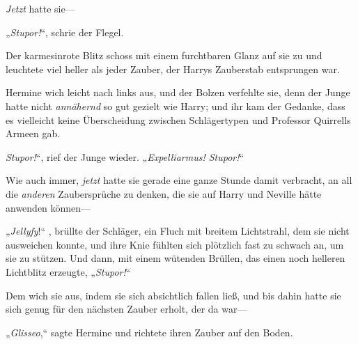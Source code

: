 \emph{Jetzt} hatte sie—

„\emph{Stupor!}“, schrie der Flegel.

Der karmesinrote Blitz schoss mit einem furchtbaren Glanz auf sie zu und leuchtete viel heller als jeder Zauber, der Harrys Zauberstab entsprungen war.

Hermine wich leicht nach links aus, und der Bolzen verfehlte sie, denn der Junge hatte nicht \emph{annähernd} so gut gezielt wie Harry; und ihr kam der Gedanke, dass es vielleicht keine Überscheidung zwischen Schlägertypen und Professor Quirrells Armeen gab.

\emph{Stupor!}“, rief der Junge wieder. „\emph{Expelliarmus! Stupor!}“

Wie auch immer, \emph{jetzt} hatte sie gerade eine ganze Stunde damit verbracht, an all die \emph{anderen} Zaubersprüche zu denken, die sie auf Harry und Neville hätte anwenden können—

„\emph{Jellyfy}!“ , brüllte der Schläger, ein Fluch mit breitem Lichtstrahl, dem sie nicht ausweichen konnte, und ihre Knie fühlten sich plötzlich fast zu schwach an, um sie zu stützen. Und dann, mit einem wütenden Brüllen, das einen noch helleren Lichtblitz erzeugte, „\emph{Stupor!}“

Dem wich sie aus, indem sie sich absichtlich fallen ließ, und bis dahin hatte sie sich genug für den nächsten Zauber erholt, der da war—

„\emph{Glisseo},“ sagte Hermine und richtete ihren Zauber auf den Boden.

